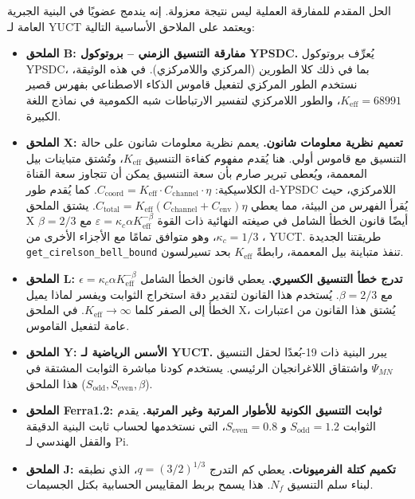 \documentclass[12pt,a4paper]{article}
\begin{document}
	الحل المقدم للمفارقة العملية ليس نتيجة معزولة. إنه يندمج عضويًا في البنية الجبرية العامة لـ YUCT ويعتمد على الملاحق الأساسية التالية:
	
	\begin{itemize}
		\item \textbf{الملحق B: مفارقة التنسيق الزمني – بروتوكول YPSDC.}  
		يُعرِّف بروتوكول YPSDC، بما في ذلك كلا الطورين (المركزي واللامركزي). في هذه الوثيقة، نستخدم الطور المركزي لتفعيل قاموس الذكاء الاصطناعي بفهرس قصير \(K_{\mathrm{eff}} = 68991\)، والطور اللامركزي لتفسير الارتباطات شبه الكمومية في نماذج اللغة الكبيرة.
		
		\item \textbf{الملحق X: تعميم نظرية معلومات شانون.}  
		يعمم نظرية معلومات شانون على حالة التنسيق مع قاموس أولي. هنا يُقدم مفهوم كفاءة التنسيق \(K_{\mathrm{eff}}\)، وتُشتق متباينات بيل المعممة، ويُعطى تبرير صارم بأن سعة التنسيق يمكن أن تتجاوز سعة القناة الكلاسيكية: \(C_{\text{coord}} = K_{\mathrm{eff}} \cdot C_{\text{channel}} \cdot \eta\). كما يُقدم طور d‑YPSDC اللامركزي، حيث يُقرأ الفهرس من البيئة، مما يعطي \(C_{\text{total}} = K_{\mathrm{eff}}(C_{\text{channel}} + C_{\text{env}})\eta\). يشتق الملحق X أيضًا قانون الخطأ الشامل في صيغته النهائية ذات القوة \(\varepsilon = \kappa_c \alpha K_{\mathrm{eff}}^{-\beta}\) مع \(\beta=2/3\)، \(\kappa_c=1/3\)، وهو متوافق تمامًا مع الأجزاء الأخرى من YUCT. طريقتنا الجديدة \texttt{get\_cirelson\_bell\_bound} تنفذ متباينة بيل المعممة، رابطةً \(K_{\mathrm{eff}}\) بحد تسيرلسون.
		
		\item \textbf{الملحق L: تدرج خطأ التنسيق الكسيري.}  
		يعطي قانون الخطأ الشامل \(\epsilon = \kappa_c \alpha K_{\mathrm{eff}}^{-\beta}\) مع \(\beta = 2/3\). يُستخدم هذا القانون لتقدير دقة استخراج الثوابت ويفسر لماذا يميل الخطأ إلى الصفر كلما \(K_{\mathrm{eff}} \to \infty\). في الملحق X، يُشتق هذا القانون من اعتبارات عامة لتفعيل القاموس.
		
		\item \textbf{الملحق Y: الأسس الرياضية لـ YUCT.}  
		يبرر البنية ذات 19-بُعدًا لحقل التنسيق \(\Psi_{MN}\) واشتقاق اللاغرانجيان الرئيسي. يستخدم كودنا مباشرة الثوابت المشتقة في هذا الملحق (\(S_{\mathrm{odd}}, S_{\mathrm{even}}, \beta\)).
		
		\item \textbf{الملحق Ferra1.2: ثوابت التنسيق الكونية للأطوار المرتبة وغير المرتبة.}  
		يقدم الثوابت \(S_{\mathrm{odd}} = 1.2\) و \(S_{\mathrm{even}} = 0.8\)، التي نستخدمها لحساب ثابت البنية الدقيقة والقفل الهندسي لـ Pi.
		
		\item \textbf{الملحق J: تكميم كتلة الفرميونات.}  
		يعطي كم التدرج \(q = (3/2)^{1/3}\)، الذي نطبقه لبناء سلم التنسيق \(N_f\). هذا يسمح بربط المقاييس الحسابية بكتل الجسيمات.
		

\end{itemize}
\end{document}
